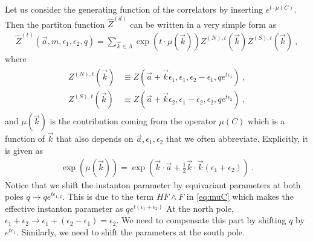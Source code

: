 \documentclass[letterpaper, 11pt]{article}
\def\e{\epsilon}
\def\half{\frac{1}{2}}
\begin{document}
Let us consider the generating function of the correlators by inserting $e^{t \cdot \mu(C)}$. Then the partiton function $\hat{Z}^{(d)}$ can be written in a very simple form as 
\begin{align}
 \hat{Z}^{(t)}(\vec{a}, m, \e_1, \e_2, q) = \sum_{\vec{k} \in \Lambda} \exp\left(t \cdot \mu(\vec{k}) \right)  Z^{(N), t} (\vec{k}) Z^{(S), t} (\vec{k})\ , 
\end{align} 
where
\begin{align}
\begin{split}
 Z^{(N), t}(\vec{k}) &\equiv Z(\vec{a}+\vec{k} \e_1, \e_1, \e_2-\e_1, q e^{t\e_1}) \ , \\
 Z^{(S), t}(\vec{k}) &\equiv Z(\vec{a}+\vec{k} \e_2, \e_1 - \e_2, \e_2, q e^{t\e_2}) \ , 
\end{split}
\end{align}
and $\mu(\vec{k})$ is the contribution coming from the operator $\mu(C)$ which is a function of $\vec{k}$ that also depends on $\vec{a}, \e_1,\e_2$ that we often abbreviate. Explicitly, it is given as
\begin{align}
 \exp \left( \mu(\vec{k}) \right) = \exp \left( \vec{k} \cdot \vec{a} +  \half \vec{k}\cdot\vec{k} (\e_1 + \e_2) \right) \ . 
\end{align}
Notice that we shift the instanton parameter by equivariant parameters at both poles $q \to q e^{t \e_{1, 2}}$. This is due to the term $H F\wedge F$ in \eqref{eq:muC} which makes the effective instanton parameter as $q e^{t(\e_1+\e_2)}$ At the north pole, $\e_1 + \e_2 \to \e_1 + (\e_2 - \e_1) = \e_2$. We need to compensate this part by shifting $q$ by $e^{t\e_1}$. Similarly, we need to shift the parameters at the south pole. 
\end{document}
